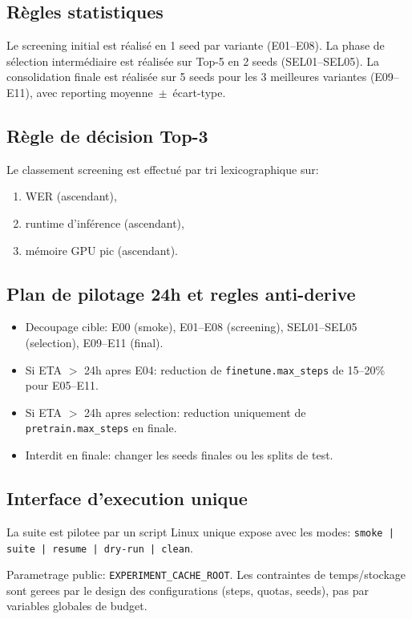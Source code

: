 \documentclass[11pt,a4paper]{article}
\begin{document}
\subsection{Règles statistiques}
Le screening initial est réalisé en 1 seed par variante (E01--E08).
La phase de sélection intermédiaire est réalisée sur Top-5 en 2 seeds (SEL01--SEL05).
La consolidation finale est réalisée sur 5 seeds pour les 3 meilleures variantes (E09--E11), avec reporting moyenne~$\pm$~écart-type.

\subsection{Règle de décision Top-3}
Le classement screening est effectué par tri lexicographique sur:
\begin{enumerate}
\item WER (ascendant),
\item runtime d'inférence (ascendant),
\item mémoire GPU pic (ascendant).
\end{enumerate}

\subsection{Plan de pilotage 24h et regles anti-derive}
\begin{itemize}
\item Decoupage cible: E00 (smoke), E01--E08 (screening), SEL01--SEL05 (selection), E09--E11 (final).
\item Si ETA $>$ 24h apres E04: reduction de \texttt{finetune.max\_steps} de 15--20\% pour E05--E11.
\item Si ETA $>$ 24h apres selection: reduction uniquement de \texttt{pretrain.max\_steps} en finale.
\item Interdit en finale: changer les seeds finales ou les splits de test.
\end{itemize}

\subsection{Interface d'execution unique}
La suite est pilotee par un script Linux unique expose avec les modes:
\texttt{smoke | suite | resume | dry-run | clean}.

Parametrage public:
\texttt{EXPERIMENT\_CACHE\_ROOT}.
Les contraintes de temps/stockage sont gerees par le design des configurations (steps, quotas, seeds), pas par variables globales de budget.
\end{document}
